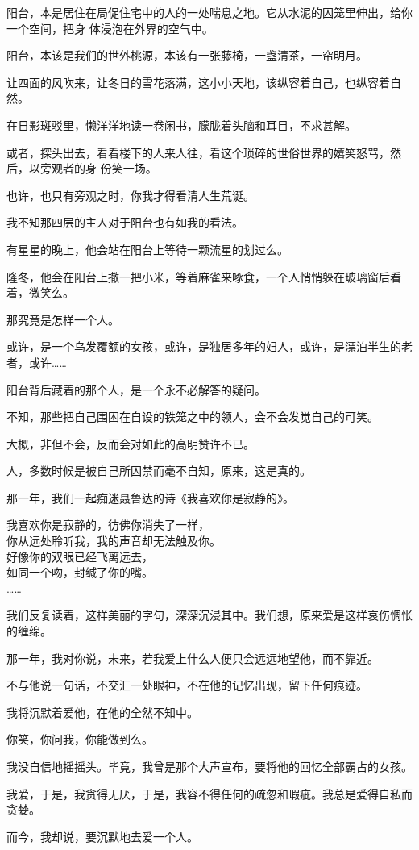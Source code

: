 		阳台，本是居住在局促住宅中的人的一处喘息之地。它从水泥的囚笼里伸出，给你一个空间，把身
	体浸泡在外界的空气中。

		阳台，本该是我们的世外桃源，本该有一张藤椅，一盏清茶，一帘明月。\par
		让四面的风吹来，让冬日的雪花落满，这小小天地，该纵容着自己，也纵容着自然。\par
		在日影斑驳里，懒洋洋地读一卷闲书，朦胧着头脑和耳目，不求甚解。

		或者，探头出去，看看楼下的人来人往，看这个琐碎的世俗世界的嬉笑怒骂，然后，以旁观者的身
	份笑一场。

		也许，也只有旁观之时，你我才得看清人生荒诞。\par
		我不知那四层的主人对于阳台也有如我的看法。\par
		有星星的晚上，他会站在阳台上等待一颗流星的划过么。\par
		隆冬，他会在阳台上撒一把小米，等着麻雀来啄食，一个人悄悄躲在玻璃窗后看着，微笑么。\par
		那究竟是怎样一个人。\par
		或许，是一个乌发覆额的女孩，或许，是独居多年的妇人，或许，是漂泊半生的老者，或许……\par
		阳台背后藏着的那个人，是一个永不必解答的疑问。\par
		不知，那些把自己围困在自设的铁笼之中的领人，会不会发觉自己的可笑。\par
		大概，非但不会，反而会对如此的高明赞许不已。\par
		人，多数时候是被自己所囚禁而毫不自知，原来，这是真的。



		那一年，我们一起痴迷聂鲁达的诗《我喜欢你是寂静的》。

		\longpoem{}{}{}
			我喜欢你是寂静的，彷佛你消失了一样，\\
			你从远处聆听我，我的声音却无法触及你。\\
			好像你的双眼已经飞离远去，\\
			如同一个吻，封缄了你的嘴。\\
			……
		\endlongpoem

		我们反复读着，这样美丽的字句，深深沉浸其中。我们想，原来爱是这样哀伤惆怅的缠绵。\par
		那一年，我对你说，未来，若我爱上什么人便只会远远地望他，而不靠近。\par
		不与他说一句话，不交汇一处眼神，不在他的记忆出现，留下任何痕迹。\par
		我将沉默着爱他，在他的全然不知中。\par
		你笑，你问我，你能做到么。\par
		我没自信地摇摇头。毕竟，我曾是那个大声宣布，要将他的回忆全部霸占的女孩。\par
		我爱，于是，我贪得无厌，于是，我容不得任何的疏忽和瑕疵。我总是爱得自私而贪婪。\par
		而今，我却说，要沉默地去爱一个人。

